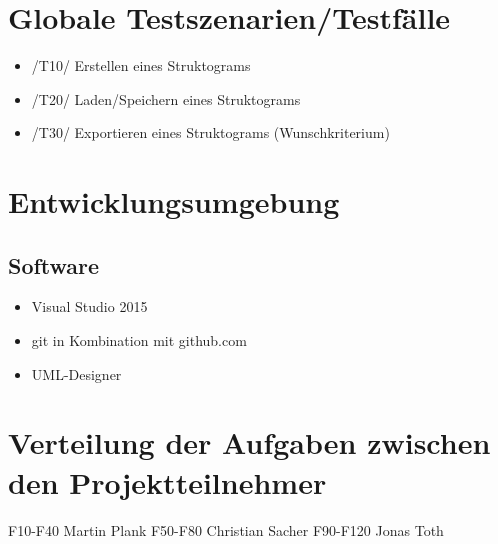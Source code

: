 \documentclass[a4paper,10pt]{report}
\begin{document}
\section{Globale Testszenarien/Testfälle}
\begin{itemize}
\item  /T10/ Erstellen eines Struktograms
\item  /T20/ Laden/Speichern eines Struktograms
\item  /T30/ Exportieren eines Struktograms (Wunschkriterium)
\end{itemize}
\section{Entwicklungsumgebung}
\subsection{Software}
\begin{itemize}
\item Visual Studio 2015
\item git in Kombination mit github.com
\item UML-Designer
\end{itemize}
\section{Verteilung der Aufgaben zwischen den Projektteilnehmer}
F10-F40 Martin Plank
F50-F80 Christian Sacher
F90-F120 Jonas Toth
\end{document}
